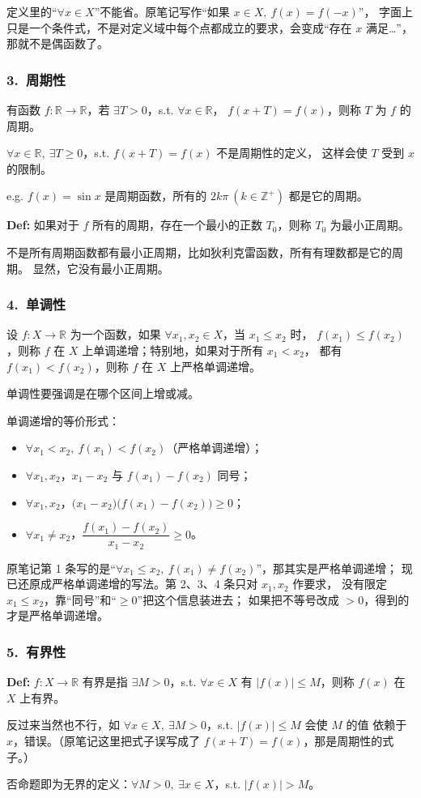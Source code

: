 \documentclass[UTF8,11pt]{ctexart}
\theoremstyle{cnthm}
\begin{document}
定义里的“$\forall x\in X$”不能省。原笔记写作“如果 $x\in X,\ f(x)=f(-x)$”，
字面上只是一个条件式，不是对定义域中每个点都成立的要求，会变成“存在 $x$ 满足…”，
那就不是偶函数了。

\subsubsection*{3.\ 周期性}

有函数 $f:\mathbb R\to\mathbb R$，若 $\exists T>0$，s.t. $\forall x\in\mathbb R$，
$f(x+T)=f(x)$，则称 $T$ 为 $f$ 的周期。

$\forall x\in\mathbb R,\ \exists T\geq0$，s.t. $f(x+T)=f(x)$ 不是周期性的定义，
这样会使 $T$ 受到 $x$ 的限制。

e.g. $f(x)=\sin x$ 是周期函数，所有的 $2k\pi\ (k\in\mathbb Z^+)$ 都是它的周期。

\textbf{Def:} 如果对于 $f$ 所有的周期，存在一个最小的正数 $T_0$，则称 $T_0$ 为最小正周期。

不是所有周期函数都有最小正周期，比如狄利克雷函数，所有有理数都是它的周期。
显然，它没有最小正周期。

\subsubsection*{4.\ 单调性}

设 $f:X\to\mathbb R$ 为一个函数，如果 $\forall x_1,x_2\in X$，当 $x_1\leq x_2$ 时，
$f(x_1)\leq f(x_2)$，则称 $f$ 在 $X$ 上单调递增；特别地，如果对于所有 $x_1<x_2$，
都有 $f(x_1)<f(x_2)$，则称 $f$ 在 $X$ 上严格单调递增。

单调性要强调是在哪个区间上增或减。

单调递增的等价形式：

\begin{itemize}
\item $\forall x_1<x_2,\ f(x_1)<f(x_2)$（严格单调递增）；
\item $\forall x_1,x_2$，$x_1-x_2$ 与 $f(x_1)-f(x_2)$ 同号；
\item $\forall x_1,x_2$，$\bigl(x_1-x_2\bigr)\bigl(f(x_1)-f(x_2)\bigr)\geq0$；
\item $\forall x_1\neq x_2$，$\dfrac{f(x_1)-f(x_2)}{x_1-x_2}\geq0$。
\end{itemize}

原笔记第 1 条写的是“$\forall x_1\leq x_2,\ f(x_1)\neq f(x_2)$”，那其实是严格单调递增；
现已还原成严格单调递增的写法。第 2、3、4 条只对 $x_1,x_2$ 作要求，
没有限定 $x_1\leq x_2$，靠“同号”和“$\geq0$”把这个信息装进去；
如果把不等号改成 $>0$，得到的才是严格单调递增。

\subsubsection*{5.\ 有界性}

\textbf{Def:} $f:X\to\mathbb R$ 有界是指 $\exists M>0$，s.t. $\forall x\in X$ 有
$|f(x)|\leq M$，则称 $f(x)$ 在 $X$ 上有界。

反过来当然也不行，如 $\forall x\in X,\ \exists M>0$，s.t. $|f(x)|\leq M$ 会使 $M$ 的值
依赖于 $x$，错误。（原笔记这里把式子误写成了 $f(x+T)=f(x)$，那是周期性的式子。）

否命题即为无界的定义：$\forall M>0,\ \exists x\in X$，s.t. $|f(x)|>M$。
\end{document}
